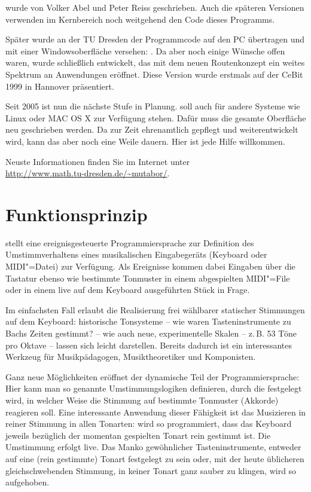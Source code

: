 \mutabor[~II] wurde von Volker Abel und Peter Reiss geschrieben.  Auch
die späteren Versionen verwenden im Kernbereich noch weitgehend den
Code dieses Programms.

Später wurde an der TU Dresden der Programmcode auf den PC 
übertragen und mit einer Windowsoberfläche versehen: \mutabor[~II.win]. 
Da aber noch einige Wünsche offen waren, wurde schließlich \mutabor[~3] 
entwickelt, das mit dem neuen Routenkonzept ein weites Spektrum 
an Anwendungen eröffnet. Diese Version wurde erstmals auf der 
CeBit 1999 in Hannover präsentiert.

Seit 2005 ist nun die nächste Stufe in Planung. \mutabor{} soll auch
für andere Systeme wie Linux oder MAC OS X zur Verfügung stehen. Dafür
muss die gesamte Oberfläche neu geschrieben werden. Da \mutabor{} zur
Zeit ehrenamtlich gepflegt und weiterentwickelt wird, kann das aber
noch eine Weile dauern. Hier ist jede Hilfe willkommen.

\begin{center}
Neuste Informationen finden Sie im Internet unter\\
{\url{http://www.math.tu-dresden.de/~mutabor/}}.
\end{center}



\section{Funktionsprinzip}

\mutabor{} stellt eine ereignisgesteuerte Programmiersprache zur
Definition des Umstimmverhaltens eines musikalischen Eingabegeräts
(Keyboard oder MIDI"=Datei) zur Verfügung. Als Ereignisse kommen dabei
Eingaben über die Tastatur ebenso wie bestimmte Tonmuster in einem
abgespielten MIDI"=File oder in einem live auf dem Keyboard
ausgeführten Stück in Frage.

Im einfachsten Fall erlaubt \mutabor{} die Realisierung frei wählbarer
statischer Stimmungen auf dem Keyboard: historische Tonsysteme -- wie
waren Tasteninstrumente zu Bachs Zeiten gestimmt? -- wie auch neue,
experimentelle Skalen -- z.\,B. 53 Töne pro Oktave -- lassen sich
leicht darstellen. Bereits dadurch ist \mutabor{} ein interessantes
Werkzeug für Musikpädagogen, Musiktheoretiker und Komponisten.

Ganz neue Möglichkeiten eröffnet der dynamische Teil der
Programmiersprache: Hier kann man so genannte Umstimmungslogiken
definieren, durch die festgelegt wird, in welcher Weise die Stimmung
auf bestimmte Tonmuster (Akkorde) reagieren soll.  Eine interessante
Anwendung dieser Fähigkeit ist das Musizieren in reiner Stimmung in
allen Tonarten: \mutabor{} wird so programmiert, dass das Keyboard
jeweils bezüglich der momentan gespielten Tonart rein gestimmt ist.
Die Umstimmung erfolgt live. Das Manko gewöhnlicher Tasteninstrumente,
entweder auf eine (rein gestimmte) Tonart festgelegt zu sein oder, mit
der heute üblicheren gleichschwebenden Stimmung, in keiner Tonart ganz
sauber zu klingen, wird so aufgehoben.


